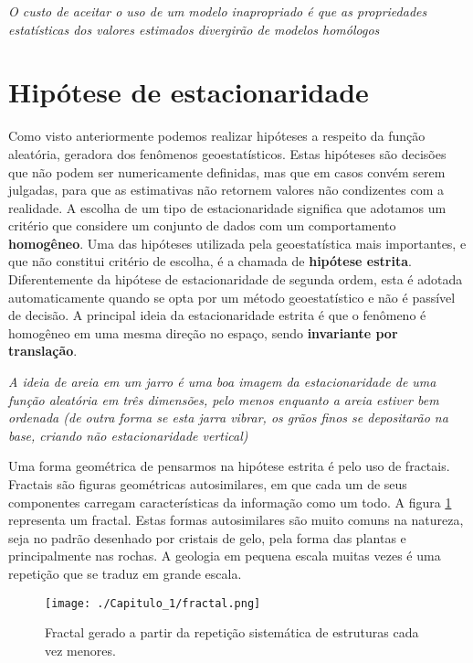 \begin{remark}
	\textit{O custo de aceitar o uso de um modelo inapropriado é que as propriedades estatísticas dos valores estimados divergirão de modelos homólogos} \citet{isaaks1989applied}
\end{remark}

\section{Hipótese de estacionaridade} 

Como visto anteriormente podemos realizar hipóteses a respeito da função aleatória, geradora dos fenômenos geoestatísticos. Estas hipóteses são decisões que não podem ser numericamente definidas, mas que em casos convém serem julgadas, para que as estimativas não retornem valores não condizentes com a realidade. A escolha de um tipo de estacionaridade significa que adotamos um critério que considere um conjunto de dados com um comportamento \textbf{homogêneo}. Uma das hipóteses utilizada pela geoestatística mais importantes, e que não constitui critério de escolha, é a chamada de \textbf{hipótese estrita}. Diferentemente da hipótese de estacionaridade de segunda ordem, esta é adotada automaticamente quando se opta por um método geoestatístico e não é passível de decisão. A principal ideia da estacionaridade estrita é que o fenômeno é homogêneo em uma mesma direção no espaço, sendo \textbf{invariante por translação}. 

\begin{remark}
	\textit{A ideia de areia em um jarro é uma boa imagem da estacionaridade de uma função aleatória em três dimensões, pelo menos enquanto a areia estiver bem ordenada (de outra forma se esta jarra vibrar, os grãos finos se depositarão na base, criando não estacionaridade vertical)} \citet{chiles2009geostatistics}
\end{remark}

Uma forma geométrica de pensarmos na hipótese estrita é pelo uso de fractais. Fractais são figuras geométricas autosimilares, em que cada um de seus componentes carregam características da informação como um todo. A figura \ref{fractal} representa um fractal. Estas formas autosimilares são muito comuns na natureza, seja no padrão desenhado por cristais de gelo, pela forma das plantas e principalmente nas rochas. A geologia em pequena escala muitas vezes é uma repetição que se traduz em grande escala. 


\FloatBarrier
\begin{figure}[!htb]
	\centering
	\texttt{[image: ./Capitulo\_1/fractal.png]}	
	\caption{Fractal gerado a partir da repetição sistemática de estruturas cada vez menores. } 
	\label{fractal}
\end{figure}
\FloatBarrier

